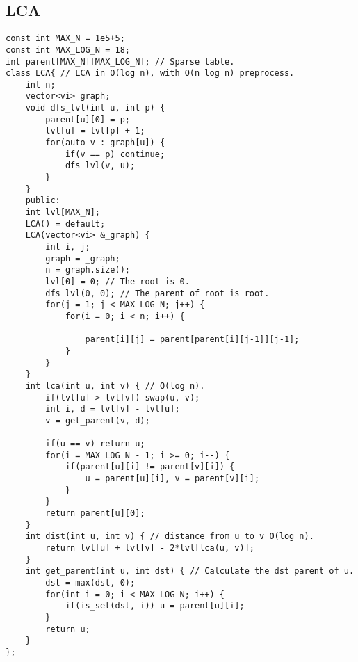 \documentclass[a4paper]{article}
\begin{document}
\subsection*{LCA}
\begin{multicols}{2}
\begin{verbatim}
const int MAX_N = 1e5+5;
const int MAX_LOG_N = 18;
int parent[MAX_N][MAX_LOG_N]; // Sparse table.
class LCA{ // LCA in O(log n), with O(n log n) preprocess.
    int n;
    vector<vi> graph;
    void dfs_lvl(int u, int p) {
        parent[u][0] = p;
        lvl[u] = lvl[p] + 1;
        for(auto v : graph[u]) {
            if(v == p) continue;
            dfs_lvl(v, u);
        }
    }
    public:
    int lvl[MAX_N];
    LCA() = default;
    LCA(vector<vi> &_graph) {
        int i, j;
        graph = _graph;
        n = graph.size();
        lvl[0] = 0; // The root is 0.
        dfs_lvl(0, 0); // The parent of root is root.
        for(j = 1; j < MAX_LOG_N; j++) {
            for(i = 0; i < n; i++) {
            
                parent[i][j] = parent[parent[i][j-1]][j-1];
            }
        }
    }
    int lca(int u, int v) { // O(log n).
        if(lvl[u] > lvl[v]) swap(u, v);
        int i, d = lvl[v] - lvl[u];
        v = get_parent(v, d);

        if(u == v) return u;
        for(i = MAX_LOG_N - 1; i >= 0; i--) {
            if(parent[u][i] != parent[v][i]) {
                u = parent[u][i], v = parent[v][i];
            }
        }
        return parent[u][0];
    }
    int dist(int u, int v) { // distance from u to v O(log n).
        return lvl[u] + lvl[v] - 2*lvl[lca(u, v)];
    }
    int get_parent(int u, int dst) { // Calculate the dst parent of u.
        dst = max(dst, 0);
        for(int i = 0; i < MAX_LOG_N; i++) {
            if(is_set(dst, i)) u = parent[u][i];
        }
        return u;
    }
};
\end{verbatim}
\end{multicols}
\end{document}
